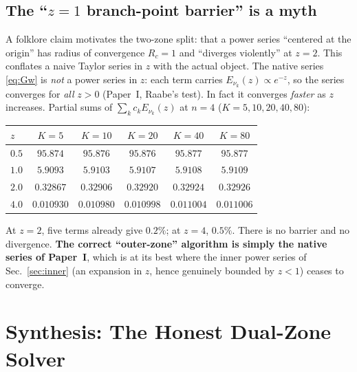 \documentclass{article}
\begin{document}
\subsection{The \texorpdfstring{``$z=1$ branch-point barrier''}{``z=1 branch-point barrier''} is a myth}

A folklore claim motivates the two-zone split: that a power series ``centered at
the origin'' has radius of convergence $R_c=1$ and ``diverges violently'' at
$z=2$.  This conflates a naive Taylor series in $z$ with the actual object.  The
native series \eqref{eq:Gw} is \emph{not} a power series in $z$: each term
carries $E_{\nu_k}(z)\propto e^{-z}$, so the series converges for \emph{all}
$z>0$ (Paper~I, Raabe's test).  In fact it converges \emph{faster} as $z$
increases.  Partial sums of $\sum_k c_k E_{\nu_k}(z)$ at $n=4$
($K=5,10,20,40,80$):
\begin{center}
\begin{tabular}{lccccc}
\toprule
$z$ & $K{=}5$ & $K{=}10$ & $K{=}20$ & $K{=}40$ & $K{=}80$\\
\midrule
$0.5$ & $95.874$ & $95.876$ & $95.876$ & $95.877$ & $95.877$\\
$1.0$ & $5.9093$ & $5.9103$ & $5.9107$ & $5.9108$ & $5.9109$\\
$2.0$ & $0.32867$ & $0.32906$ & $0.32920$ & $0.32924$ & $0.32926$\\
$4.0$ & $0.010930$ & $0.010980$ & $0.010998$ & $0.011004$ & $0.011006$\\
\bottomrule
\end{tabular}
\end{center}
At $z=2$, five terms already give $0.2\%$; at $z=4$, $0.5\%$.  There is no
barrier and no divergence.  \textbf{The correct ``outer-zone'' algorithm is
simply the native series of Paper~I}, which is at its best where the inner power
series of Sec.~\ref{sec:inner} (an expansion in $z$, hence genuinely bounded by
$z<1$) ceases to converge.

\section{Synthesis: The Honest Dual-Zone Solver}
\label{sec:synth}
\end{document}
